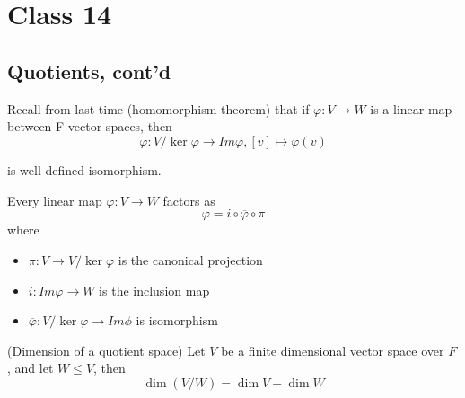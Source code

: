 \section{Class 14}

\subsection{Quotients, cont'd}

Recall from last time (homomorphism theorem) that if $\varphi: V \to W$ is a linear map between F-vector spaces, then 
\[
    \tilde{\varphi}: V/{\ker \varphi} \to Im \varphi, [v] \mapsto \varphi(v)
\]

is well defined isomorphism. 

\begin{corollary}
    Every linear map $\varphi: V \to W$ factors as 
    \[
        \varphi = i \circ \overline{\varphi} \circ \pi
    \]
    where 
    \begin{itemize}
        \item $\pi: V \to V/ \ker \varphi$ is the canonical projection 
        \item $i: Im \varphi \to W$ is the inclusion map
        \item $\overline{\varphi}: V / \ker \varphi \to Im\phi$ is isomorphism
    \end{itemize} 
\end{corollary}

\begin{proposition}
    (Dimension of a quotient space) Let $V$ be a finite dimensional vector space over $F$, and let $W \leq V$, then 
    \[
        \dim \left( V /W \right)  = \dim V - \dim W
    \]
\end{proposition}

